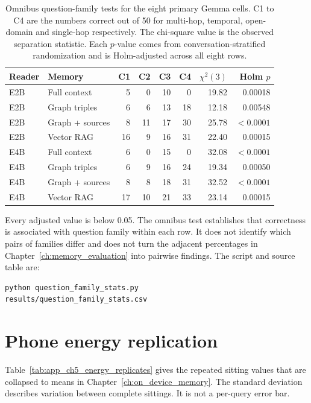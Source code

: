 \begin{table}[htbp]
  \centering
  \small
  \setlength{\tabcolsep}{4pt}
  \begin{tabular}{llrrrrrr}
    \toprule
    Reader & Memory & C1 & C2 & C3 & C4 & $\chi^2(3)$ & Holm $p$ \\
    \midrule
    E2B & Full context    & 5 & 0 & 10 & 0 & 19.82 & 0.00018 \\
    E2B & Graph triples   & 6 & 6 & 13 & 18 & 12.18 & 0.00548 \\
    E2B & Graph + sources & 8 & 11 & 17 & 30 & 25.78 & $<0.0001$ \\
    E2B & Vector RAG      & 16 & 9 & 16 & 31 & 22.40 & 0.00015 \\
    E4B & Full context    & 6 & 0 & 15 & 0 & 32.08 & $<0.0001$ \\
    E4B & Graph triples   & 6 & 9 & 16 & 24 & 19.34 & 0.00050 \\
    E4B & Graph + sources & 8 & 8 & 18 & 31 & 32.52 & $<0.0001$ \\
    E4B & Vector RAG      & 17 & 10 & 21 & 33 & 23.14 & 0.00015 \\
    \bottomrule
  \end{tabular}
  \caption{Omnibus question-family tests for the eight primary Gemma cells. C1 to C4
  are the numbers correct out of 50 for multi-hop, temporal, open-domain and single-hop
  respectively. The chi-square value is the observed separation statistic. Each
  $p$-value comes from conversation-stratified randomization and is Holm-adjusted across
  all eight rows.}
  \label{tab:app_ch5_question_family}
\end{table}

Every adjusted value is below 0.05. The omnibus test establishes that correctness is
associated with question family within each row. It does not identify which pairs of
families differ and does not turn the adjacent percentages in Chapter~\ref{ch:memory_evaluation} into pairwise findings. The script and source table are:

\begin{verbatim}
python question_family_stats.py
results/question_family_stats.csv
\end{verbatim}

\section{Phone energy replication}
\label{app:ch5_energy_replication}

Table~\ref{tab:app_ch5_energy_replicates} gives the repeated sitting values that are
collapsed to means in Chapter~\ref{ch:on_device_memory}. The standard deviation describes
variation between complete sittings. It is not a per-query error bar.

